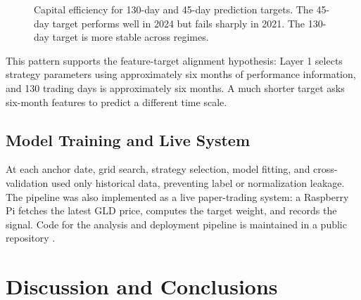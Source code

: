\documentclass[11pt, letterpaper]{article}
\begin{document}
\begin{figure}[htbp]
\centering
{}
\caption{Capital efficiency for 130-day and 45-day prediction targets. The 45-day target performs well in 2024 but fails sharply in 2021. The 130-day target is more stable across regimes.}
\label{fig:horizon}
\end{figure}

This pattern supports the feature-target alignment hypothesis: Layer 1 selects strategy parameters using approximately six months of performance information, and 130 trading days is approximately six months. A much shorter target asks six-month features to predict a different time scale.

\subsection{Model Training and Live System}

At each anchor date, grid search, strategy selection, model fitting, and cross-validation used only historical data, preventing label or normalization leakage. The pipeline was also implemented as a live paper-trading system: a Raspberry Pi fetches the latest GLD price, computes the target weight, and records the signal. Code for the analysis and deployment pipeline is maintained in a public repository \citep{chun2026repo}.

\section{Discussion and Conclusions}
\end{document}
